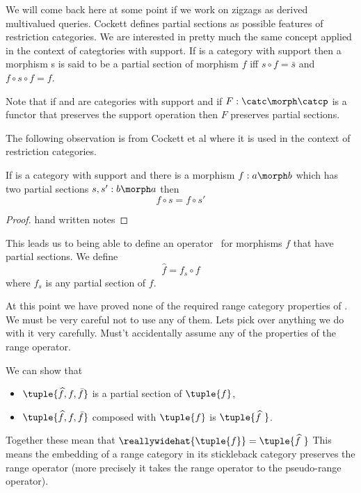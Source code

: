 \begin{aside}
We will come back here at some point if we work on zigzags as derived multivalued queries.
Cockett defines partial sections as possible features of restriction categories. 
We are interested in pretty much the same concept applied in the context of categtories with support. If \catcw is a category with support then a morphism s is said to be a partial section of  morphism $f$ iff
$s \circ f = \bar{s}$ and $f \circ s \circ f = f$.

Note that if \catcw and \catcpw are categories with support 
and if $F: \catc \morph \catcp$ is a functor that preserves the support operation then $F$ preserves partial sections.

The following observation is from  Cockett et al where it is used in the context of restriction categories.
\begin{lemma}
If \catcw is a category with support and there is a morphism $f: a \morph b$
which has two partial sections $s,s':b \morph a$ then
\[
f \circ s = f \circ s' 
\]
\end{lemma}
\begin{proof}
hand written notes
\end{proof}

This leads us to being able to define an operator \rngItself \ for
morphisms $f$ that have partial sections. 
We define
\[\widehat{f} = f_s \circ f\]
where $f_s$ is any partial section of $f$.

\begin{notebox}[Warning]
At this point we have proved none of the required range category properties of \rngItself. We must be very careful not to use any of them. Lets pick over anything we do with it very carefully. Must't accidentally assume any of the properties of the range operator. 
\end{notebox}

We can show that
\begin{itemize}
\item $\tuple{\widehat{f},f,\bar{f}}$ is a partial section
of $\tuple{f}$,
\item $\tuple{\widehat{f},f,\bar{f}}$ composed with $\tuple{f}$ is $\tuple{\widehat{f\ }}$.
\end{itemize}
Together these mean that $\reallywidehat{\tuple{f}}=\tuple{\widehat{f\ }}$
This means the embedding of a range category in its stickleback category
preserves the range operator (more precisely it takes the range operator to the pseudo-range operator).
\end{aside}

